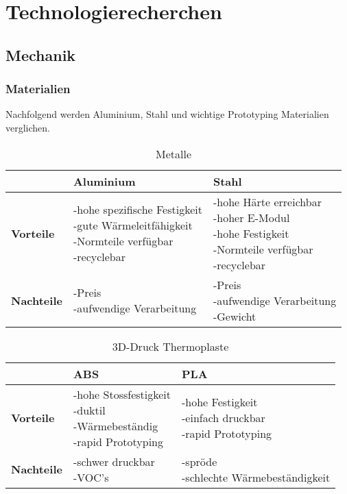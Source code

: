 \section{Technologierecherchen}


\subsection{Mechanik}


\subsubsection{Materialien}

Nachfolgend werden Aluminium, Stahl und wichtige Prototyping Materialien verglichen.

\begin{table}[H]
\centering
\small
\begin{tabularx}{\textwidth}{|l|X|X|}
\hline
  \textbf{} & \textbf{Aluminium} & \textbf{Stahl} \\
  \hline
  \textbf{Vorteile}  & \makecell{-hohe spezifische Festigkeit\\ -gute Wärmeleitfähigkeit \\ -Normteile verfügbar \\ -recyclebar} & \makecell{-hohe Härte erreichbar \\-hoher E-Modul\\-hohe Festigkeit \\ -Normteile verfügbar\\ -recyclebar}\\ 
  \hline
  \textbf{Nachteile} & \makecell{-Preis \\ -aufwendige Verarbeitung \\} & \makecell{-Preis\\-aufwendige Verarbeitung \\ -Gewicht}\\
  \hline
\end{tabularx}
\caption{Metalle}
\label{table:metals-comparison}
\end{table}


\begin{table}[H]
\centering
\small
\begin{tabularx}{\textwidth}{|l|X|X|}
\hline
  \textbf{} & \textbf{ABS} & \textbf{PLA} \\
  \hline
  \textbf{Vorteile}  & \makecell{-hohe Stossfestigkeit\\ -duktil \\ -Wärmebeständig \\ -rapid Prototyping} & \makecell{-hohe Festigkeit \\-einfach druckbar\\ -rapid Prototyping}\\
  \hline
  \textbf{Nachteile} & \makecell{-schwer druckbar \\ -VOC's  \\} & \makecell{-spröde\\-schlechte Wärmebeständigkeit}\\
  \hline
\end{tabularx}
\caption{3D-Druck Thermoplaste}
\label{table:fdm-thermoplasts-comparison}
\end{table}


